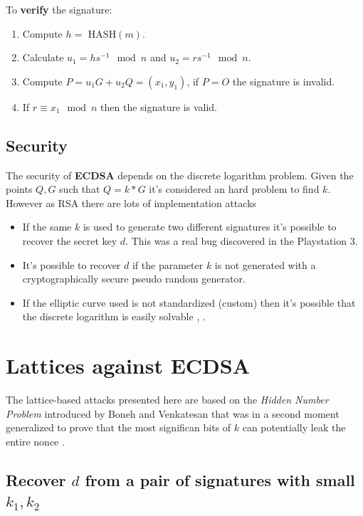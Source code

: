 \documentclass[a4paper,12pt]{report}
\begin{document}
\vspace*{10px}

To \textbf{verify} the signature:

\begin{enumerate}
    \item Compute $h = $ HASH$(m)$.
    \item Calculate $u_1 = hs^{-1} \mod n$ and $u_2 = rs^{-1} \mod n$.
    \item Compute $P = u_1G + u_2Q = (x_1, y_1)$, if $P = O$ the signature is invalid.
    \item If $r \equiv x_1 \mod n$ then the signature is valid.
\end{enumerate}

\subsection{Security}

The security of \textbf{ECDSA} depends on the discrete logarithm problem.
Given the points $Q, G$ such that $Q = k*G$ it's considered an hard problem to find $k$.
However as RSA there are lots of implementation attacks

\begin{itemize}
    \item If the same $k$ is used to generate two different signatures it's possible to recover the secret key $d$. This was a real bug 
        discovered in the Playstation 3.
    \item It's possible to recover $d$ if the parameter $k$ is not generated with a cryptographically secure pseudo random generator.
    \item If the elliptic curve used is not standardized (custom) then it's possible that the discrete logarithm is easily solvable
        \cite{giuliani99attackson}, \cite{mov} \cite{smartass}.
\end{itemize}

\section{Lattices against ECDSA}

The lattice-based attacks presented here are based on the \textit{Hidden Number Problem} introduced
by Boneh and Venkatesan \cite{hnp} that was in a second moment generalized to prove that the most significan bits
of $k$ can potentially leak the entire nonce \cite{ecdsa_nonce}.

\subsection{Recover $d$ from a pair of signatures with small $k_1, k_2$}
\end{document}
